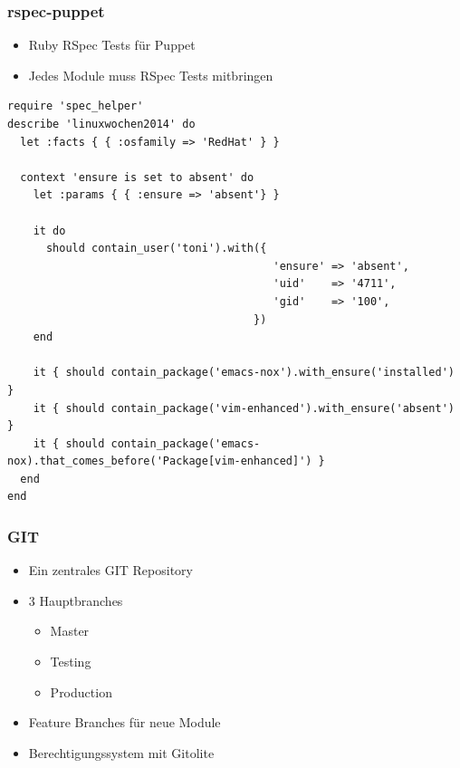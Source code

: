 \documentclass{beamer}
\begin{document}
\begin{frame}
\end{frame}

\begin{frame}
\end{frame}

\begin{frame}[fragile]
  \frametitle{rspec-puppet}

  \begin{itemize}
  \item Ruby RSpec Tests für Puppet
  \item Jedes Module muss RSpec Tests mitbringen
  \end{itemize}

  \begin{lstlisting}
require 'spec_helper'
describe 'linuxwochen2014' do
  let :facts { { :osfamily => 'RedHat' } }

  context 'ensure is set to absent' do
    let :params { { :ensure => 'absent'} }

    it do
      should contain_user('toni').with({
                                         'ensure' => 'absent',
                                         'uid'    => '4711',
                                         'gid'    => '100',
                                      })
    end

    it { should contain_package('emacs-nox').with_ensure('installed') }
    it { should contain_package('vim-enhanced').with_ensure('absent') }
    it { should contain_package('emacs-nox).that_comes_before('Package[vim-enhanced]') }
  end
end
  \end{lstlisting}

\end{frame}

\begin{frame}
\end{frame}

\begin{frame}
\end{frame}

\begin{frame}
  \frametitle{GIT}

  \begin{itemize}
  \item Ein zentrales GIT Repository
  \item 3 Hauptbranches
    \begin{itemize}
    \item Master
    \item Testing
    \item Production
    \end{itemize}
  \item Feature Branches für neue Module
  \item Berechtigungssystem mit Gitolite
  \end{itemize}
\end{frame}
\end{document}
